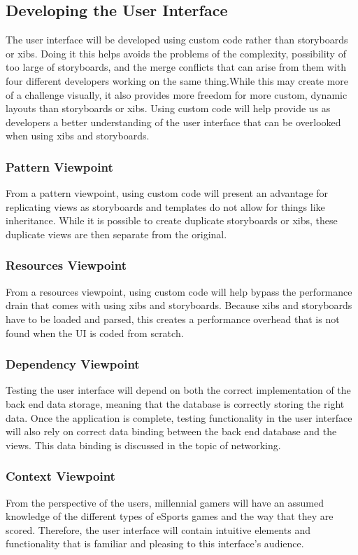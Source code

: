 \documentclass[onecolumn, draftclsnofoot,10pt, compsoc]{IEEEtran}
\begin{document}
\subsection{Developing the User Interface}
The user interface will be developed using custom code rather than storyboards or xibs. Doing it this helps avoids the problems of the complexity, possibility of too large of storyboards, and the merge conflicts that can arise from them with four different developers working on the same thing.While this may create more of a challenge visually, it also provides more freedom for more custom, dynamic layouts than storyboards or xibs. Using custom code will help provide us as developers a better understanding of the user interface that can be overlooked when using xibs and storyboards.  
 \subsubsection{Pattern Viewpoint}
  From a pattern viewpoint, using custom code will present an advantage for replicating views as storyboards and templates do not allow for things like inheritance. While it is possible to create duplicate storyboards or xibs, these duplicate views are then separate from the original.
  \subsubsection{Resources Viewpoint}
  From a resources viewpoint, using custom code will help bypass the performance drain that comes with using xibs and storyboards. Because xibs and storyboards have to be loaded and parsed, this creates a performance overhead that is not found when the UI is coded from scratch. 
  \subsubsection{Dependency Viewpoint}
  Testing the user interface will depend on both the correct implementation of the back end data storage, meaning that the database is correctly storing the right data. Once the application is complete, testing functionality in the user interface will also rely on correct data binding between the back end database and the views. This data binding is discussed in the topic of networking. 
   \subsubsection{Context Viewpoint}
   From the perspective of the users, millennial gamers will have an assumed  knowledge of the different types of eSports games and the way that they are scored. Therefore, the user interface will contain intuitive elements and functionality that is familiar and pleasing to this interface's audience.
   
\end{document}
